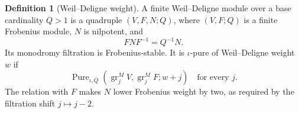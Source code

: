 \documentclass[10pt]{article}
\theoremstyle{definition}
\newtheorem{definition}[theorem]{Definition}
\newcommand{\gr}{\operatorname{gr}}
\begin{document}
\begin{definition}[Weil--Deligne weight]
A finite Weil--Deligne module over a base cardinality \(Q>1\) is a
quadruple \((V,F,N;Q)\), where \((V,F;Q)\) is a finite Frobenius module,
\(N\) is nilpotent, and
\[
                         FNF^{-1}=Q^{-1}N.
\]
Its monodromy filtration is Frobenius-stable.  It is \(\iota\)-pure of
Weil--Deligne weight \(w\) if
\[
 \operatorname{Pure}_{\iota,Q}
       (\gr_j^M V,\gr_j^M F;w+j)
 \quad\text{for every }j.
\]
The relation with \(F\) makes \(N\) lower Frobenius weight by two, as
required by the filtration shift \(j\mapsto j-2\).
\end{definition}
\end{document}
